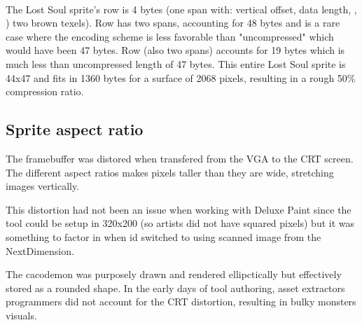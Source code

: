 \\
\par
The Lost Soul sprite's row  is 4 bytes (one span with:  vertical offset,  data length, , ) two brown texels). Row  has two spans, accounting for 48 bytes and is a rare case where the encoding scheme is less favorable than "uncompressed" which would have been 47 bytes. Row  (also two spans) accounts for 19 bytes which is much less than uncompressed length of 47 bytes. This entire Lost Soul sprite is 44x47 and fits in 1360 bytes for a surface of 2068 pixels, resulting in a rough 50\% compression ratio.\\
\par

\subsection{Sprite aspect ratio}
The framebuffer was distored when transfered from the VGA to the CRT screen. The different aspect ratios makes pixels taller than they are wide, stretching images vertically.\\
\par
This distortion had not been an issue when working with Deluxe Paint since the tool could be setup in 320x200 (so artists did not have squared pixels) but it was something to factor in when id switched to using scanned image from the NextDimension.




\par
The cacodemon was purposely drawn and rendered ellipctically but effectively stored as a rounded shape. In the early days of tool authoring, asset extractors programmers did not account for the CRT distortion, resulting in bulky monsters visuals.\\
\par
{}

